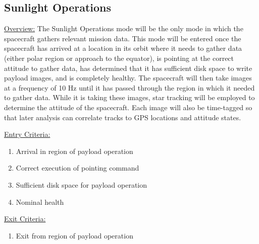 \documentclass{article}
\begin{document}
\clearpage

\subsection{Sunlight Operations}

\underline{Overview:} The Sunlight Operations mode will be the only mode in which the spacecraft gathers relevant mission data. This mode will be entered once the spacecraft has arrived at a location in its orbit where it needs to gather data (either polar region or approach to the equator), is pointing at the correct attitude to gather data, has determined that it has sufficient disk space to write payload images, and is completely healthy. The spacecraft will then take images at a frequency of 10 Hz until it has passed through the region in which it needed to gather data. While it is taking these images, star tracking will be employed to determine the attitude of the spacecraft. Each image will also be time-tagged so that later analysis can correlate tracks to GPS locations and attitude states.

\underline{Entry Criteria:} 

\begin{enumerate}
\item Arrival in region of payload operation
\item Correct execution of pointing command
\item Sufficient disk space for payload operation
\item Nominal health
\end{enumerate}

\underline{Exit Criteria:}

\begin{enumerate}
\item Exit from region of payload operation
\end{enumerate}
\end{document}
